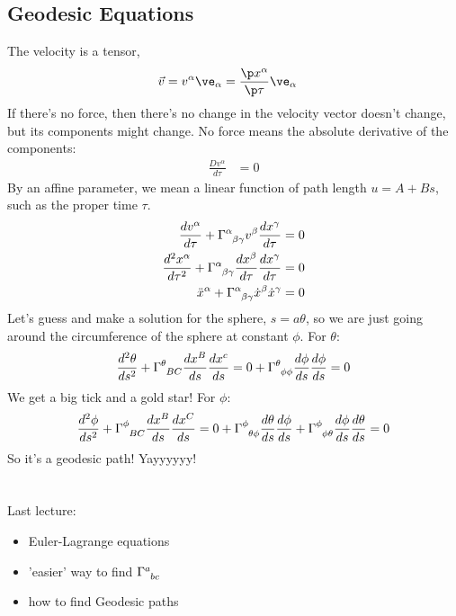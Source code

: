 \documentclass[a4paper, 11pt, normalem]{report}
\begin{document}
\section{Geodesic Equations}
The velocity is a tensor,
\begin{align}
    \vec{v} &= v^\alpha\ve_{\alpha} = \frac{\p x^\alpha}{\p\tau}\ve_\alpha
\end{align}
If there's no force, then there's no change in the velocity vector doesn't change, but its components might change. 
No force means the absolute derivative of the components: 
\begin{align}
    \frac{Dv^\alpha}{d\tau} &= 0
\end{align}
By an affine parameter, we mean a linear function of path length $u=A+Bs$, such as the proper time $\tau$.
\begin{align}
    \frac{dv^\alpha}{d\tau} + \tensor{\Gamma}{^\alpha_{\beta\gamma}}v^\beta\frac{dx^\gamma}{d\tau} &= 0 \\
    \frac{d^2x^\alpha}{d\tau^2} + \tensor{\Gamma}{^\alpha_{\beta\gamma}}\frac{dx^\beta}{d\tau}\frac{dx^\gamma}{d\tau} &= 0 \\
    \ddot{x}^\alpha + \tensor{\Gamma}{^\alpha_{\beta\gamma}}\dot{x}^\beta\dot{x}^\gamma &= 0
\end{align}
Let's guess and make a solution for the sphere, $s=a\theta$, so we are just going around the circumference of the sphere at constant $\phi$.
For $\theta$:
\begin{align}
    \frac{d^2\theta}{ds^2} + \tensor{\Gamma}{^\theta_{BC}}\frac{dx^B}{ds}\frac{dx^c}{ds} = 0 + \tensor{\Gamma}{^\theta_{\phi\phi}}\frac{d\phi}{ds}\frac{d\phi}{ds} = 0
\end{align}
We get a big tick and a gold star!
For $\phi$:
\begin{align}
    \frac{d^2\phi}{ds^2} + \tensor{\Gamma}{^\phi_{BC}}\frac{dx^B}{ds}\frac{dx^C}{ds} = 0 + \tensor{\Gamma}{^\phi_{\theta\phi}}\frac{d\theta}{ds}\frac{d\phi}{ds} + \tensor{\Gamma}{^\phi_{\phi\theta}}\frac{d\phi}{ds}\frac{d\theta}{ds} = 0 
\end{align}
So it's a geodesic path! Yayyyyyy!


\chapter{}

\chapter{}
Last lecture:
\begin{itemize}
    \item Euler-Lagrange equations 
    \item 'easier' way to find $\tensor{\Gamma}{^a_{bc}}$
    \item how to find Geodesic paths
\end{itemize}
\end{document}
